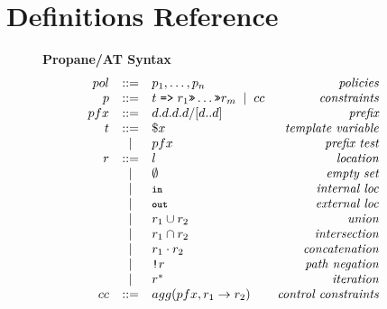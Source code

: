 \documentclass[twocolumn, openany]{sig-alternate-10pt}
\newcommand{\KW}[1]{\texttt{\small\bfseries{#1}}}
\newcommand{\Prefer}{\texttt{>>}}
\newcommand{\Path}{\texttt{=>}}
\newcommand{\In}{\KW{in}}
\newcommand{\Out}{\KW{out}}
\newcommand{\NOT}{\texttt{!}}
\newcommand{\BNFALT}{\;\;|\;\;}
\newcommand{\hdr}[2]{\flushleft \chdr{\hspace{5mm}#1}{#2}}
\newcommand{\chdr}[2]{\textbf{#1} {#2} \\ \centering}%
\begin{document}
\setlength{\pdfpageheight}{\paperheight}
\setlength{\pdfpagewidth}{\paperwidth}

\onecolumn

\appendix

\vspace{2em}
\section{Definitions Reference}

\begin{figure*}[h!]\small
  \begin{minipage}[t]{.45\linewidth}
  \hdr{Propane/AT Syntax}{}
  \vspace*{-1\baselineskip}
  \[ \begin{array}{rclr}
     pol     &::=& p_1, \dots, p_n & \textit{policies} \\
     p       &::=& t \hspace{.3em} \Path \hspace{.3em} r_1 \Prefer \dots \Prefer r_m \BNFALT cc & \textit{constraints} \\
     pfx     &::=& d.d.d.d/[d..d] & \textit{prefix} \\
     t       &::=& \$x & \textit{template variable} \\
         &\BNFALT& pfx & \textit{prefix test} \\
     r       &::=& l & \textit{location} \\
         &\BNFALT& \emptyset & \textit{empty set} \\
         &\BNFALT& \In & \textit{internal loc} \\
         &\BNFALT& \Out & \textit{external loc} \\
         &\BNFALT& r_1 \cup r_2 & \textit{union} \\
         &\BNFALT& r_1 \cap r_2 & \textit{intersection} \\
         &\BNFALT& r_1 \cdot r_2 & \textit{concatenation} \\
         &\BNFALT& \NOT r & \textit{path negation} \\
         &\BNFALT& r^* & \textit{iteration} \\
     cc     &::=& agg(pfx, r_1 \rightarrow r_2)  & \textit{control constraints} \\
  \end{array} \]%


\end{minipage}
\end{figure*}
\end{document}
